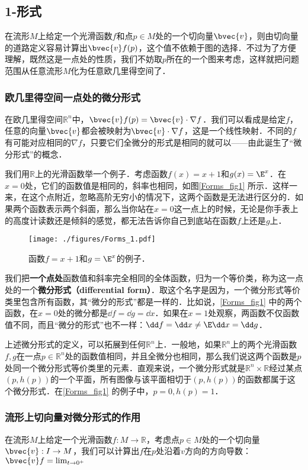 

\subsection{1-形式}

在流形$M$上给定一个光滑函数$f$和点$p\in M$处的一个切向量$\bvec{v}$，则由切向量的道路定义容易计算出$\bvec{v}f(p)$，这个值不依赖于图的选择．不过为了方便理解，既然这是一点处的性质，我们不妨取$p$所在的一个图来考虑，这样就把问题范围从任意流形$M$化为任意欧几里得空间了．

\subsubsection{欧几里得空间一点处的微分形式}



在欧几里得空间$\mathbb{R}^n$中，$\bvec{v}f(p)=\bvec{v}\cdot\nabla f$．我们可以看成是给定$f$，任意的向量$\bvec{v}$都会被映射为$\bvec{v}\cdot\nabla f$，这是一个线性映射．不同的$f$有可能对应相同的$\nabla f$，只要它们全微分的形式是相同的就可以——由此诞生了“微分形式”的概念．

我们用$\mathbb{R}$上的光滑函数举一个例子．考虑函数$f(x)=x+1$和$g(x)=\E^x$．在$x=0$处，它们的函数值是相同的，斜率也相同，如图\autoref{Forms_fig1} 所示．这样一来，在这个点附近，忽略高阶无穷小的情况下，这两个函数是无法进行区分的．如果两个函数表示两个斜面，那么当你站在$x=0$这一点上的时候，无论是你手表上的高度计读数还是倾斜的感觉，都无法告诉你自己到底站在函数$f$上还是$g$上．

\begin{figure}[ht]
\centering
\texttt{[image: ./figures/Forms\_1.pdf]}
\caption{函数$f=x+1$和$g=\E^x$的例子．} \label{Forms_fig1}
\end{figure}

我们把\textbf{一个点处}函数值和斜率完全相同的全体函数，归为一个等价类，称为这一点处的一个\textbf{微分形式（differential form）}．取这个名字是因为，一个微分形式等价类里包含所有函数，其“微分的形式”都是一样的．比如说，\autoref{Forms_fig1} 中的两个函数，在$x=0$处的微分都是$\dd f=\dd g=\dd x$．如果在$x=1$处观察，两函数不仅函数值不同，而且“微分的形式”也不一样：$\dd f=\dd x\not=\E\dd x=\dd g$．

上述微分形式的定义，可以拓展到任何$\mathbb{R}^n$上．一般地，如果$\mathbb{R}^n$上的两个光滑函数$f, g$在一点$p\in\mathbb{R}^n$处的函数值相同，并且全微分也相同，那么我们说这两个函数是$p$处同一个微分形式等价类里的元素．直观来说，一个微分形式就是$\mathbb{R}^n\times\mathbb{R}$经过某点$(p, h(p))$的一个平面，所有图像与该平面相切于$(p, h(p))$的函数都属于这个微分形式．在\autoref{Forms_fig1} 的例子中，$p=0, h(p)=1$．

\subsubsection{流形上切向量对微分形式的作用}

在流形$M$上给定一个光滑函数$f:M\rightarrow \mathbb{R}$，考虑点$p\in M$处的一个切向量$\bvec{v}:I\rightarrow M$，我们可以计算出$f$在$p$处沿着$v$方向的方向导数：$\bvec{v}f=\lim_{t\rightarrow 0^+}$






